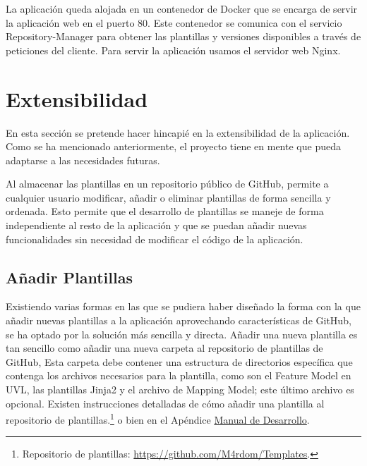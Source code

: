 \documentclass[12pt, a4paper, twoside]{article}
\begin{document}
La aplicación queda alojada en un contenedor de Docker que se encarga de servir la aplicación web en el puerto 80. Este contenedor se comunica con el servicio Repository-Manager para obtener las plantillas y versiones disponibles a través de peticiones del cliente.
Para servir la aplicación usamos el servidor web Nginx.













\section{Extensibilidad}
\label{sec:Extensibilidad}
En esta sección se pretende hacer hincapié en la extensibilidad de la aplicación.
Como se ha mencionado anteriormente, el proyecto tiene en mente que pueda adaptarse a las necesidades futuras.

Al almacenar las plantillas en un repositorio público de GitHub, permite a cualquier usuario modificar, añadir o eliminar plantillas de forma sencilla y ordenada.
Esto permite que el desarrollo de plantillas se maneje de forma independiente al resto de la aplicación y que se puedan añadir nuevas funcionalidades sin necesidad de modificar el código de la aplicación.
\subsection{Añadir Plantillas}
Existiendo varias formas en las que se pudiera haber diseñado la forma con la que añadir nuevas plantillas a la aplicación aprovechando características de GitHub, se ha optado por la solución más sencilla y directa.
Añadir una nueva plantilla es tan sencillo como añadir una nueva carpeta al repositorio de plantillas de GitHub,
Esta carpeta debe contener una estructura de directorios específica que contenga los archivos necesarios para la plantilla, como son el Feature Model en UVL, las plantillas Jinja2 y el archivo de Mapping Model; este último archivo es opcional.
Existen instrucciones detalladas de cómo añadir una plantilla al repositorio de plantillas.\footnote{Repositorio de plantillas: \url{https://github.com/M4rdom/Templates}.} o bien en el Apéndice \hyperref[sec:Manual de Desarrollo]{Manual de Desarrollo}.

\newpage
\end{document}
